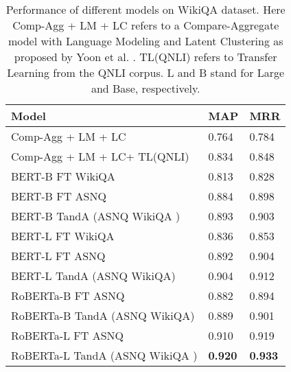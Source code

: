 \documentclass[letterpaper]{article} \usepackage{aaai20}  \usepackage{times}  \usepackage{helvet} \usepackage{courier}  \usepackage[hyphens]{url}  \usepackage{graphicx} \urlstyle{rm} \def\UrlFont{\rm}  \usepackage{graphicx}  \usepackage{todonotes}
\newcommand{\TANDA}{T{\sc and}A}
\begin{document}
\begin{table}[t]
\small
\center
\begin{tabular}{|l|l|l|}
\hline
\textbf{Model}                                                                         & \textbf{MAP}   & \textbf{MRR}   \\ \hline
Comp-Agg + LM + LC                                                            & 0.764 & 0.784 \\ \hline
Comp-Agg + LM + LC+ TL(QNLI)                                                  & 0.834 & 0.848 \\ \hline
\hline
BERT-B	FT WikiQA                                                           & 0.813 & 0.828 \\ \hline
BERT-B	 FT ASNQ                                                             & 0.884 & 0.898 \\ \hline
BERT-B	  {\TANDA} (ASNQ   WikiQA )                                                 & 0.893 & 0.903 \\ \hline \hline
BERT-L	 FT WikiQA                                                          & 0.836 & 0.853 \\ \hline
BERT-L	 FT ASNQ                                                            & 0.892 & 0.904 \\ \hline
BERT-L	  {\TANDA} (ASNQ   WikiQA)                                                 & 0.904 & 0.912 \\ \hline \hline
RoBERTa-B	 FT ASNQ                                                             & 0.882 & 0.894 \\ \hline
RoBERTa-B	  {\TANDA} (ASNQ   WikiQA)                                                  & 0.889 & 0.901 \\ \hline
RoBERTa-L	 FT ASNQ                                                            & 0.910 & 0.919 \\ \hline
RoBERTa-L	  {\TANDA} (ASNQ   WikiQA )                                                & \textbf{0.920} & \textbf{0.933} \\ \hline
\end{tabular}\caption{Performance of different models on WikiQA dataset. 
Here Comp-Agg + LM + LC refers to a Compare-Aggregate model with Language Modeling and Latent Clustering as proposed by Yoon et al. . 
TL(QNLI) refers to Transfer Learning from the QNLI corpus. L and B stand for Large and Base, respectively.}
\label{Table:WikiQA_results}
\vspace{-0.5em}
\end{table}
\end{document}
